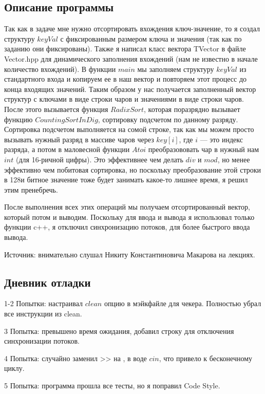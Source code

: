 \documentclass[12pt]{article}
\begin{document}
\subsection*{Описание программы}

Так как в задаче мне нужно отсортировать вхождения ключ-значение, то я создал структуру $keyVal$ с фиксированным размером ключа и значения (так как по заданию они фиксированы).  Также я написал класс вектора TVector в файле Vector.hpp для динамического заполнения вхождений (нам не известно в начале количество вхождений). В функции $main$ мы заполняем структуру $keyVal$ из стандартного входа и копируем ее в наш вектор и повторяем этот процесс до конца входящих значений. Таким образом у нас получается заполненный вектор структур с ключами в виде строки чаров и значениями в виде строки чаров. После этого вызывается функция $RadixSort$, которая поразрядно вызывает функцию $CountingSortInDig$, сортировку подсчетом по данному разряду. Сортировка подсчетом выполняется на сомой строке, так как мы можем просто вызывать нужный разряд в массиве чаров через $key[i]$, где $i$ — это индекс разряда, а потом в маловесной функции $Atoi$ преобразововать чар в нужный нам $int$ (для 16-ричной цифры). Это эффективнее чем делать $div$ и $mod$, но менее эффективно чем побитовая сортировка, но поскольку преобразование этой строки в 128и битное значение тоже будет занимать какое-то лишнее время, я решил этим пренебречь. 

После выполнения всех этих операций мы получаем отсортированный вектор, который потом и выводим. Поскольку для ввода и вывода я использовал только функции c++, я отключил синхронизацию потоков, для более быстрого ввода вывода.

Источник: внимательно слушал Никиту Константиновича Макарова на лекциях.

\subsection*{Дневник отладки}

1-2 Попытки: настраивал $clean$ опцию в мэйкфайле для чекера. Полностью убрал все инструкции из clean.

3 Попытка: превышено время ожидания, добавил строку для отключения синхронизации потоков.

4 Попытка: случайно заменил >> на , в воде $cin$, что привело к бесконечному циклу.

5 Попытка: программа прошла все тесты, но я поправил Code Style.
\end{document}
